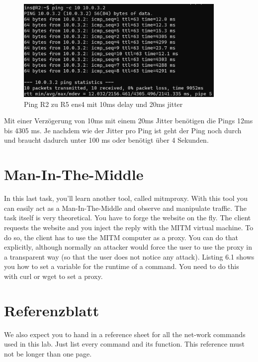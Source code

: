 \documentclass[11pt,titlepage]{article}
\newenvironment{shadedquotation}
 {\begin{shaded*}
  \quoting[leftmargin=0pt, vskip=0pt]
 }
 {\endquoting
 \end{shaded*}
}
\begin{document}
  \begin{figure}[H]
  	\begin{center}
  		\includegraphics[width=0.90\textwidth]{"images/Ping R2 to R5 10ms delay 20ms jitter"}
  		\caption{Ping R2 zu R5 ens4 mit 10ms delay und 20ms jitter}
  		\label{fig:Ping-R2-to-R5-10ms-delay-20ms-jitter}
  	\end{center}
  \end{figure}
  Mit einer Verzögerung von 10ms mit einem 20ms Jitter benötigen die Pings 12ms bis 4305 ms. Je nachdem wie der Jitter pro Ping ist geht der Ping noch durch und braucht dadurch unter 100 ms oder benötigt über 4 Sekunden.

\section{Man-In-The-Middle}
\begin{shadedquotation}
	In this last task, you’ll learn another tool, called mitmproxy. With this tool you can easily act
	as a Man-In-The-Middle and observe and manipulate traffic. The task itself is very theoretical.
	You have to forge the website on the fly. The client requests the website and you inject the reply
	with the MITM virtual machine. To do so, the client has to use the MITM computer as a proxy.
	You can do that explicitly, although normally an attacker would force the user to use the proxy
	in a transparent way (so that the user does not notice any attack).
	Listing 6.1 shows you how to set a variable for the runtime of a command. You need to do this
	with curl or wget to set a proxy.
\end{shadedquotation}


\newpage
\section{Referenzblatt}
\label{sec:Referenzblatt}
\begin{shadedquotation}
  We also expect you to hand in a reference sheet for all the net-work commands used in this lab. Just list every command and its function. This reference must not be longer than one page.
\end{shadedquotation}
\end{document}
